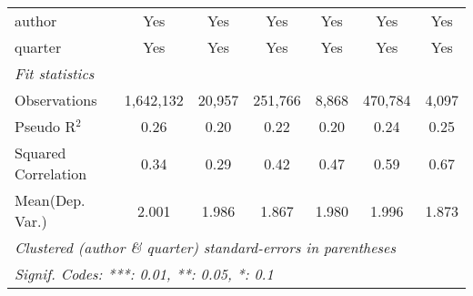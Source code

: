 \begin{tabular}{lcccccc}
   author                                                     & Yes           & Yes           & Yes           & Yes          & Yes           & Yes\\  
   quarter                                                    & Yes           & Yes           & Yes           & Yes          & Yes           & Yes\\  
   \midrule
   \emph{Fit statistics}\\
   Observations                                               & 1,642,132     & 20,957        & 251,766       & 8,868        & 470,784       & 4,097\\  
   Pseudo R$^2$                                               & 0.26          & 0.20          & 0.22          & 0.20         & 0.24          & 0.25\\  
   Squared Correlation                                        & 0.34          & 0.29          & 0.42          & 0.47         & 0.59          & 0.67\\  
Mean(Dep. Var.) & 2.001 & 1.986 & 1.867 & 1.980 & 1.996 & 1.873 \\
   \midrule \midrule
   \multicolumn{7}{l}{\emph{Clustered (author \& quarter) standard-errors in parentheses}}\\
   \multicolumn{7}{l}{\emph{Signif. Codes: ***: 0.01, **: 0.05, *: 0.1}}\\
\end{tabular}
\par\endgroup
